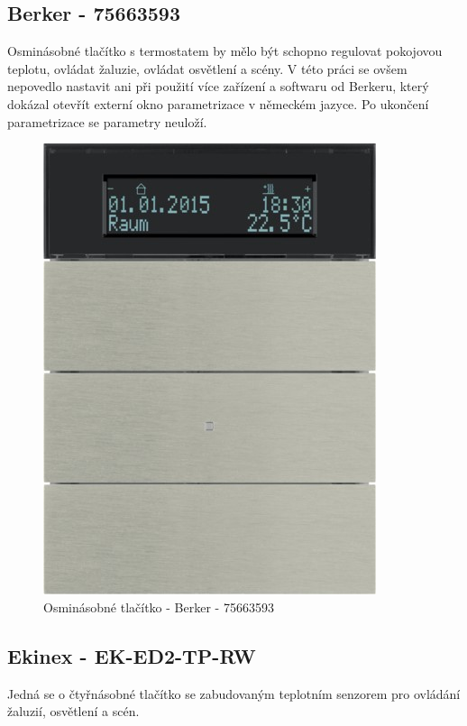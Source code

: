 \subsection{Berker - 75663593}
Osminásobné tlačítko s termostatem by mělo být schopno regulovat pokojovou teplotu, ovládat žaluzie, ovládat osvětlení a scény. V této práci se ovšem nepovedlo nastavit ani při použití více zařízení a softwaru od Berkeru, který dokázal otevřít externí okno parametrizace v německém jazyce. Po ukončení parametrizace se parametry neuloží. \cite{Berker}
\begin{figure}[!ht]
  \begin{center}
    \includegraphics[scale=1.3]{obrazky/Berker.jpg}
  \end{center}
  \caption[Osminásobné tlačítko Berker - 75663593 \cite{Berker}]{Osminásobné tlačítko - Berker - 75663593 \cite{Berker}}
  \label{fig:Osminásobné člačítko s termostatem Berker 75663593}
\end{figure}
\newpage
\subsection{Ekinex - EK-ED2-TP-RW}
Jedná se o čtyřnásobné tlačítko se zabudovaným teplotním senzorem pro ovládání žaluzií, osvětlení a scén. \cite{Ekinex}

